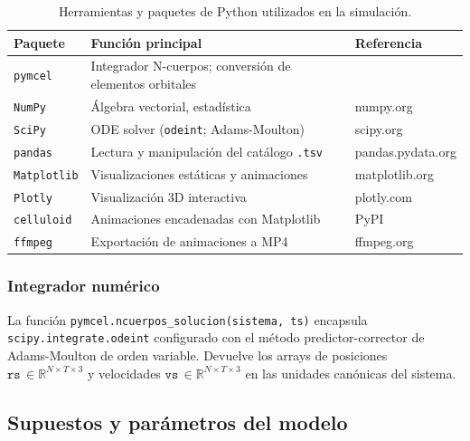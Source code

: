 \documentclass[12pt,a4paper]{article}
\begin{document}
\begin{table}[H]
  \centering
  \caption{Herramientas y paquetes de Python utilizados en la simulación.}
  \label{tab:herramientas}
  \begin{tabular}{llp{4cm}}
    \toprule
    Paquete & Función principal & Referencia \\
    \midrule
    \texttt{pymcel} & Integrador N-cuerpos; conversión de elementos orbitales & \citet{zuluaga2026pymcel} \\
    \texttt{NumPy} & Álgebra vectorial, estadística & numpy.org \\
    \texttt{SciPy} & ODE solver (\texttt{odeint}; Adams-Moulton) & scipy.org \\
    \texttt{pandas} & Lectura y manipulación del catálogo \texttt{.tsv} & pandas.pydata.org \\
    \texttt{Matplotlib} & Visualizaciones estáticas y animaciones & matplotlib.org \\
    \texttt{Plotly} & Visualización 3D interactiva & plotly.com \\
    \texttt{celluloid} & Animaciones encadenadas con Matplotlib & PyPI \\
    \texttt{ffmpeg} & Exportación de animaciones a MP4 & ffmpeg.org \\
    \bottomrule
  \end{tabular}
\end{table}

\subsubsection{Integrador numérico}
\label{subsubsec:integrador}

La función \texttt{pymcel.ncuerpos\_solucion(sistema, ts)} \citep{zuluaga2026pymcel} encapsula
\texttt{scipy.integrate.odeint} configurado con el método predictor-corrector de
Adams-Moulton de orden variable.  Devuelve los arrays de posiciones
$\texttt{rs}\,\in\mathbb{R}^{N\times T\times3}$ y velocidades
$\texttt{vs}\,\in\mathbb{R}^{N\times T\times3}$ en las unidades canónicas del
sistema.

\subsection{Supuestos y parámetros del modelo}
\label{subsec:supuestos}
\end{document}
